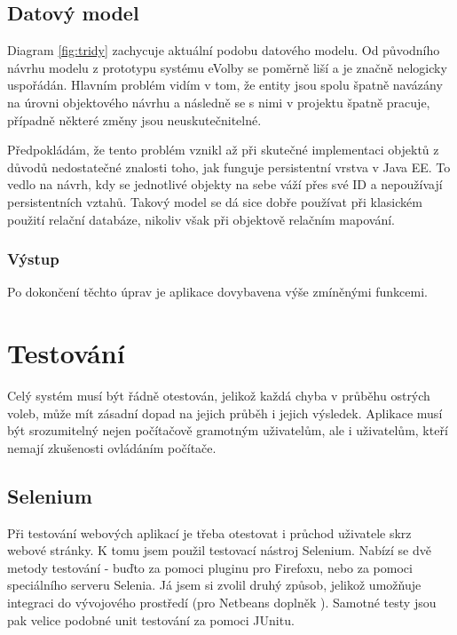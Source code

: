 \documentclass[11pt,twoside,a4paper]{book}
\begin{document}
\section{Datový model}

Diagram \ref{fig:tridy} zachycuje aktuální podobu datového modelu. Od původního návrhu modelu z prototypu systému eVolby\cite{www:prototyp} se poměrně liší a je značně nelogicky uspořádán. Hlavním problém vidím v tom, že entity jsou spolu špatně navázány na úrovni objektového návrhu a následně se s nimi v projektu špatně pracuje, případně některé změny jsou neuskutečnitelné.

Předpokládám, že tento problém vznikl až při skutečné implementaci objektů z důvodů nedostatečné znalosti toho, jak funguje persistentní vrstva v Java EE. To vedlo na návrh, kdy se jednotlivé objekty na sebe váží přes své ID a nepoužívají persistentních vztahů. Takový model se dá sice dobře používat při klasickém použití relační databáze, nikoliv však při objektově relačním mapování.

\subsection{Výstup}

Po dokončení těchto úprav je aplikace dovybavena výše zmíněnými funkcemi.


\chapter{Testování}

Celý systém musí být řádně otestován, jelikož každá chyba v průběhu ostrých voleb, může mít zásadní dopad na jejich průběh i jejich výsledek. Aplikace musí být srozumitelný nejen počítačově gramotným uživatelům, ale i uživatelům, kteří nemají zkušenosti  ovládáním počítače. 


\section{Selenium}

Při testování webových aplikací je třeba otestovat i průchod uživatele skrz webové stránky. K tomu jsem použil testovací nástroj Selenium. Nabízí se dvě metody testování - buďto za pomoci pluginu pro Firefoxu, nebo za pomoci speciálního serveru Selenia. Já jsem si zvolil druhý způsob, jelikož umožňuje integraci do vývojového prostředí (pro Netbeans doplněk ). Samotné testy jsou pak velice podobné unit testování za pomoci JUnitu. 
\end{document}
